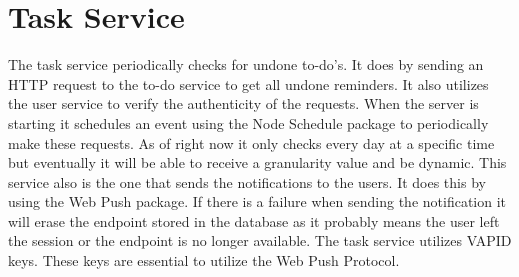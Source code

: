 	\section{Task Service}
		The task service periodically checks for undone to-do's. It does by sending an HTTP request to the to-do service to get all undone reminders. It also utilizes the user service to verify the authenticity of the requests. 
		When the server is starting it schedules an event using the Node Schedule package\cite{nodeschedule} to periodically make these requests. As of right now it only checks every day at a specific time but eventually it will be able to receive a granularity value and be dynamic.
		This service also is the one that sends the notifications to the users. It does this by using the Web Push package\cite{webpush}. 
		If there is a failure when sending the notification it will erase the endpoint stored in the database as it probably means the user left the session or the endpoint is no longer available.
		The task service utilizes VAPID\cite{vapid} keys. These keys are essential to utilize the Web Push Protocol.